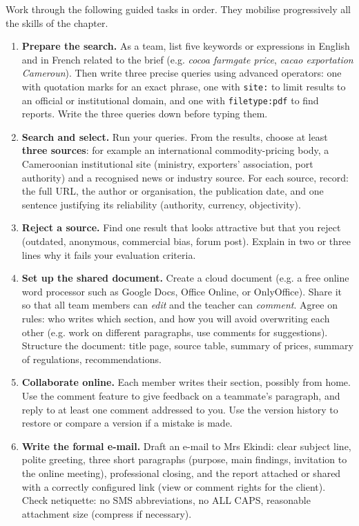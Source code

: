 \documentclass[11pt]{article}
\newcommand{\cle}[1]{{\popxbold\color{popdark}#1}}
\newcounter{popsec}
\newcounter{popsub}
\newcommand{\courssub}[1]{%
  \stepcounter{popsub}%
  \par\vspace{9pt}\noindent{\popxbold\fontsize{11.5}{13}\selectfont\color{popink}{\color{poporange}\thepopsec.\thepopsub}\hspace{6pt}#1}\par\nopagebreak\vspace{4pt}
}
\begin{document}
\courssub{Tasks}

Work through the following guided tasks in order. They mobilise progressively all the skills of the chapter.

\begin{enumerate}
\item \textbf{Prepare the search.} As a team, list five keywords or expressions in English and in French related to the brief (e.g. \emph{cocoa farmgate price}, \emph{cacao exportation Cameroun}). Then write three precise queries using advanced operators: one with quotation marks for an exact phrase, one with \texttt{site:} to limit results to an official or institutional domain, and one with \texttt{filetype:pdf} to find reports. Write the three queries down before typing them.
\item \textbf{Search and select.} Run your queries. From the results, choose at least \textbf{three sources}: for example an international commodity-pricing body, a Cameroonian institutional site (ministry, exporters' association, port authority) and a recognised news or industry source. For each source, record: the full \cle{URL}, the author or organisation, the publication date, and one sentence justifying its reliability (authority, currency, objectivity).
\item \textbf{Reject a source.} Find one result that looks attractive but that you reject (outdated, anonymous, commercial bias, forum post). Explain in two or three lines why it fails your evaluation criteria.
\item \textbf{Set up the shared document.} Create a cloud document (e.g. a free online word processor such as Google Docs, Office Online, or OnlyOffice). Share it so that all team members can \emph{edit} and the teacher can \emph{comment}. Agree on rules: who writes which section, and how you will avoid overwriting each other (e.g. work on different paragraphs, use comments for suggestions). Structure the document: title page, source table, summary of prices, summary of regulations, recommendations.
\item \textbf{Collaborate online.} Each member writes their section, possibly from home. Use the comment feature to give feedback on a teammate's paragraph, and reply to at least one comment addressed to you. Use the \cle{version history} to restore or compare a version if a mistake is made.
\item \textbf{Write the formal e-mail.} Draft an e-mail to Mrs Ekindi: clear subject line, polite greeting, three short paragraphs (purpose, main findings, invitation to the online meeting), professional closing, and the report attached or shared with a correctly configured link (view or comment rights for the client). Check netiquette: no SMS abbreviations, no ALL CAPS, reasonable attachment size (compress if necessary).

\end{enumerate}
\end{document}
